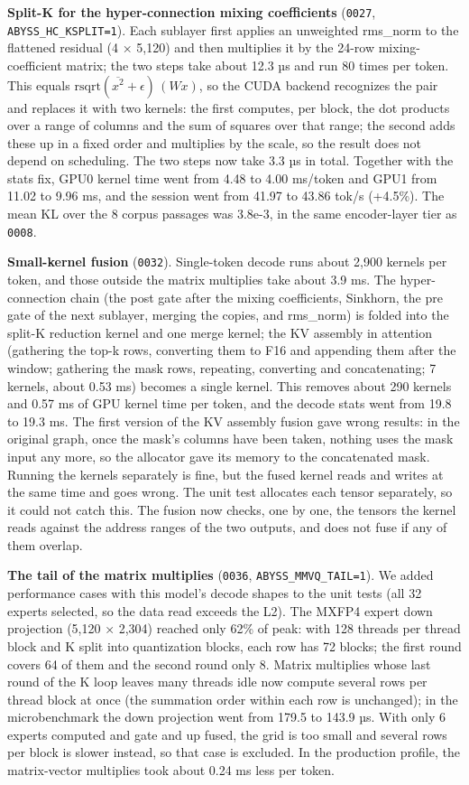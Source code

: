 \documentclass[11pt,a4paper]{article}
\newcommand{\code}[1]{\texttt{#1}}
\newcommand{\tps}{tok/s}
\begin{document}
\textbf{Split-K for the hyper-connection mixing coefficients} (\code{0027}, \code{ABYSS\_HC\_KSPLIT=1}). Each sublayer first applies an unweighted rms\_norm to the flattened residual (4 × 5,120) and then multiplies it by the 24-row mixing-coefficient matrix; the two steps take about 12.3 µs and run 80 times per token. This equals $\mathrm{rsqrt}(\overline{x^2}+\epsilon)\,(Wx)$, so the CUDA backend recognizes the pair and replaces it with two kernels: the first computes, per block, the dot products over a range of columns and the sum of squares over that range; the second adds these up in a fixed order and multiplies by the scale, so the result does not depend on scheduling. The two steps now take 3.3 µs in total. Together with the stats fix, GPU0 kernel time went from 4.48 to 4.00 ms/token and GPU1 from 11.02 to 9.96 ms, and the session went from 41.97 to 43.86 \tps{} (+4.5\%). The mean KL over the 8 corpus passages was 3.8e-3, in the same encoder-layer tier as \code{0008}.

\textbf{Small-kernel fusion} (\code{0032}). Single-token decode runs about 2,900 kernels per token, and those outside the matrix multiplies take about 3.9 ms. The hyper-connection chain (the post gate after the mixing coefficients, Sinkhorn, the pre gate of the next sublayer, merging the copies, and rms\_norm) is folded into the split-K reduction kernel and one merge kernel; the KV assembly in attention (gathering the top-k rows, converting them to F16 and appending them after the window; gathering the mask rows, repeating, converting and concatenating; 7 kernels, about 0.53 ms) becomes a single kernel. This removes about 290 kernels and 0.57 ms of GPU kernel time per token, and the decode stats went from 19.8 to 19.3 ms. The first version of the KV assembly fusion gave wrong results: in the original graph, once the mask's columns have been taken, nothing uses the mask input any more, so the allocator gave its memory to the concatenated mask. Running the kernels separately is fine, but the fused kernel reads and writes at the same time and goes wrong. The unit test allocates each tensor separately, so it could not catch this. The fusion now checks, one by one, the tensors the kernel reads against the address ranges of the two outputs, and does not fuse if any of them overlap.

\textbf{The tail of the matrix multiplies} (\code{0036}, \code{ABYSS\_MMVQ\_TAIL=1}). We added performance cases with this model's decode shapes to the unit tests (all 32 experts selected, so the data read exceeds the L2). The MXFP4 expert down projection (5,120 × 2,304) reached only 62\% of peak: with 128 threads per thread block and K split into quantization blocks, each row has 72 blocks; the first round covers 64 of them and the second round only 8. Matrix multiplies whose last round of the K loop leaves many threads idle now compute several rows per thread block at once (the summation order within each row is unchanged); in the microbenchmark the down projection went from 179.5 to 143.9 µs. With only 6 experts computed and gate and up fused, the grid is too small and several rows per block is slower instead, so that case is excluded. In the production profile, the matrix-vector multiplies took about 0.24 ms less per token.
\end{document}
